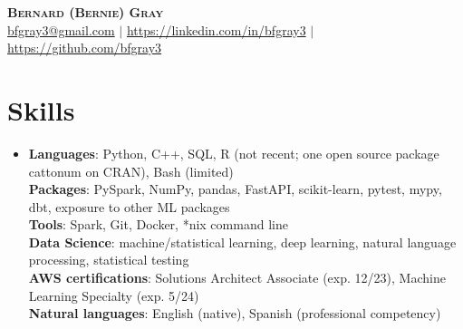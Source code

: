 \documentclass[letterpaper,11pt]{article}
\begin{document}
\begin{center}
    \textbf{\Huge \scshape Bernard (Bernie) Gray} \\ \vspace{1pt}
    \href{mailto:bfgray3@gmail.com}{bfgray3@gmail.com} $|$
    \url{https://linkedin.com/in/bfgray3} $|$
    \url{https://github.com/bfgray3}
\end{center}

\section{Skills}
 \begin{itemize}[leftmargin=0.15in, label={}]
    \item{
     \textbf{Languages}{: Python, C++, SQL, R (not recent; one open source package cattonum on CRAN), Bash (limited)} \\
     \textbf{Packages}{: PySpark, NumPy, pandas, FastAPI, scikit-learn, pytest, mypy, dbt, exposure to other ML packages} \\
     \textbf{Tools}{: Spark, Git, Docker, *nix command line} \\
     \textbf{Data Science}{: machine/statistical learning, deep learning, natural language processing, statistical testing} \\
     \textbf{AWS certifications}{: Solutions Architect Associate (exp. 12/23), Machine Learning Specialty (exp. 5/24)} \\
     \textbf{Natural languages}{: English (native), Spanish (professional competency)}
}
 \end{itemize}
\end{document}

